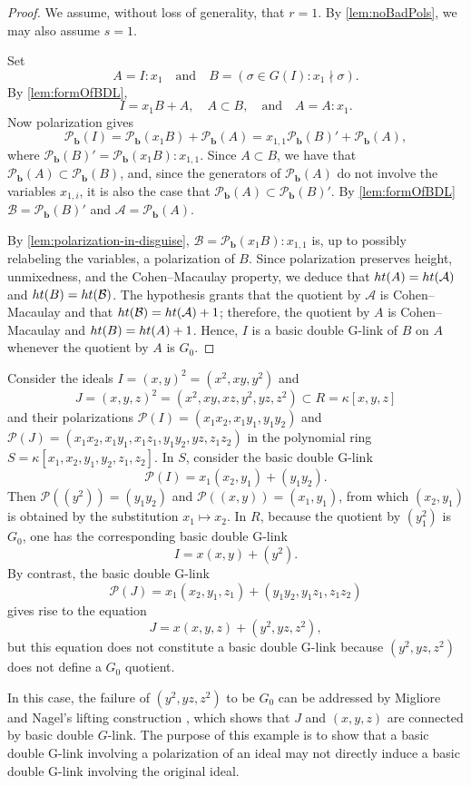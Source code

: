 \documentclass[12pt, reqno]{amsart}
\numberwithin{equation}{section}
\newtheorem{Main Conjecture}[theorem]{Main Conjecture}
\theoremstyle{definition}
\newenvironment{example}
  {\pushQED{\qed}\renewcommand{\qedsymbol}{$\diamondsuit$}\examplex}
  {\popQED\endexamplex}
\theoremstyle{plain}
\newcommand{\hgt}{{\rm{ht }}}
\newcommand{\A}{\mathcal{A}}
\newcommand{\B}{\mathcal{B}}
\renewcommand{\P}{\mathcal{P}}
\newcommand{\bb}{\mathbf{b}}
\newcommand{\qand}{\quad \mbox{and} \quad}
\begin{document}
 \begin{proof}
 We assume, without loss of generality, that $r=1$. By \cref{lem:noBadPols}, we may also assume $s=1$.
 
 Set $$A = I:x_1 \qand B=(\sigma \in G(I) : x_1 \nmid \sigma).$$ 
 By \cref{lem:formOfBDL}, $$I = x_{1}B+A, \quad A\subset B, \qand A = A:x_1.$$
Now polarization gives 
\[ \P_{\bb}(I)= \P_{\bb}(x_1 B)+\P_{\bb}(A)= x_{1,1}\P_{\bb}(B)'+\P_{\bb}(A),\]
where $\P_{\bb}(B)' = \P_{\bb}(x_1B):x_{1,1}$. Since $A\subset B$, we have that $\P_{\bb}(A)\subset \P_{\bb}(B)$, and, since the generators of $\P_{\bb}(A)$ do not involve the variables $x_{1,i}$, it is also the case that $\P_{\bb}(A)\subset \P_{\bb}(B)'$.  By \cref{lem:formOfBDL} $\B=\P_{\bb}(B)'$ and $\A=\P_{\bb}(A)$.  
 
By \cref{lem:polarization-in-disguise}, $\B =\P_{\bb}(x_1B):x_{1,1}$ is, up to possibly relabeling the variables, a polarization of $B$. Since polarization preserves height, unmixedness, and the Cohen--Macaulay property, we deduce that $\hgt(A)=\hgt(\A)$ and $\hgt(B)=\hgt(\B)$.  The hypothesis grants that the quotient by $\A$ is Cohen--Macaulay and that $\hgt(\B)=\hgt(\A)+1$; therefore, the quotient by $A$ is Cohen--Macaulay and $\hgt(B)=\hgt(A)+1$. Hence, $I$ is a basic double G-link of $B$ on $A$ whenever the quotient by $A$ is $G_0$.
 \end{proof}

 \begin{example}\label{ex:monomialPol}
Consider the ideals $I = (x,y)^2 = (x^2,xy,y^2)$ and \[
J = (x,y,z)^2 = (x^2, xy, xz, y^2, yz, z^2)\subset R=\kappa[x,y,z]
\] and their polarizations $\P(I) = (x_1x_2,x_1y_1,y_1y_2)$ and $\P(J) = (x_1x_2, x_1y_1, x_1z_1, y_1y_2, yz, z_1z_2)$ in the polynomial ring $S=\kappa[x_1,x_2,y_1,y_2,z_1,z_2]$. 
In $S$, consider the basic double G-link
\[
\P(I) = x_1(x_2,y_1)+(y_1y_2).
\]
Then $\P((y^2))=(y_1y_2)$ and $\P((x,y))=(x_1,y_1)$, from which $(x_2,y_1)$ is obtained by the substitution $x_1 \mapsto x_2$.
In $R$, because the quotient by $(y_1^2)$ is $G_0$, one has the corresponding basic double G-link
\[
I = x(x,y)+(y^2).
\]
By contrast, the basic double G-link 
\[
\P(J) = x_1(x_2,y_1, z_1)+(y_1y_2, y_1z_1, z_1z_2) 
\] gives rise to the equation \[
J = x(x,y,z)+(y^2,yz,z^2),
\] but this equation does not constitute a basic double G-link because $(y^2,yz,z^2)$ does not define a $G_0$ quotient.

In this case, the failure of $(y^2,yz,z^2)$ to be $G_0$ can be addressed by Migliore and Nagel's lifting construction \cite{MN00}, which shows that $J$ and $(x,y,z)$ are connected by basic double $G$-link. The purpose of this example is to show that a basic double G-link involving a polarization of an ideal may not directly induce a basic double G-link involving the original ideal.
\end{example}
\end{document}
